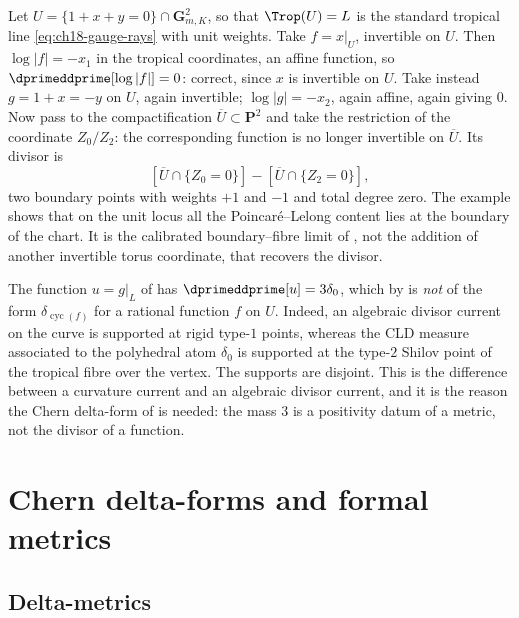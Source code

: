 \begin{example}
\label{ex:ch18-pl-line}
Let $U=\{1+x+y=0\}\cap\mathbf G_{m,K}^2$, so that $\Trop(U)=L$ is the
standard tropical line \eqref{eq:ch18-gauge-rays} with unit weights.  Take
$f=x|_U$, invertible on $U$.  Then $\log|f|=-x_1$ in the tropical
coordinates, an affine function, so
$\dprimeddprime[\log|f|]=0$: correct, since $x$ is invertible on $U$.  Take
instead $g=1+x=-y$ on $U$, again invertible; $\log|g|=-x_2$, again affine,
again giving $0$.  Now pass to the compactification
$\overline U\subset\mathbf P^2$ and take the restriction of the coordinate
$Z_0/Z_2$: the corresponding function is no longer invertible on
$\overline U$.  Its divisor is
\[
 [\overline U\cap\{Z_0=0\}]-[\overline U\cap\{Z_2=0\}],
\]
two boundary points with weights $+1$ and $-1$ and total degree zero.  The
example shows that on the unit locus all the
Poincar\'e--Lelong content lies at the boundary of the chart.  It is the
calibrated boundary--fibre limit of
, not the addition of another invertible
torus coordinate, that recovers the divisor.
\end{example}

\begin{example}
\label{ex:ch18-gauge-not-pl}
The function $u=g|_L$ of  has
$\dprimeddprime[u]=3\delta_0$, which by
 is \emph{not} of the form
$\delta_{\operatorname{cyc}(f)}$ for a rational function $f$ on $U$.
Indeed, an algebraic divisor current on the curve is supported at rigid
type-$1$ points, whereas the CLD measure associated to the polyhedral atom
$\delta_0$ is supported at the type-$2$ Shilov point of the tropical fibre
over the vertex.  The supports are disjoint.  This is the difference between
a curvature current and an algebraic divisor current, and it is the reason the Chern delta-form of
 is needed: the mass $3$ is a positivity datum of
a metric, not the divisor of a function.
\end{example}

\section{Chern delta-forms and formal metrics}
\label{sec:ch18-chern-delta}

\subsection{Delta-metrics}
\label{sec:ch18-delta-metrics}

